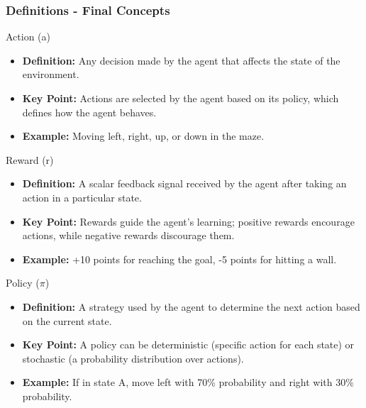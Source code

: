 \documentclass[aspectratio=169]{beamer}
\begin{document}
\begin{frame}[fragile]
    \frametitle{Definitions - Final Concepts}
    \begin{block}{Action (a)}
        \begin{itemize}
            \item \textbf{Definition:} Any decision made by the agent that affects the state of the environment.
            \item \textbf{Key Point:} Actions are selected by the agent based on its policy, which defines how the agent behaves.
            \item \textbf{Example:} Moving left, right, up, or down in the maze.
        \end{itemize}
    \end{block}

    \begin{block}{Reward (r)}
        \begin{itemize}
            \item \textbf{Definition:} A scalar feedback signal received by the agent after taking an action in a particular state.
            \item \textbf{Key Point:} Rewards guide the agent's learning; positive rewards encourage actions, while negative rewards discourage them.
            \item \textbf{Example:} +10 points for reaching the goal, -5 points for hitting a wall.
        \end{itemize}
    \end{block}

    \begin{block}{Policy (\(\pi\))}
        \begin{itemize}
            \item \textbf{Definition:} A strategy used by the agent to determine the next action based on the current state.
            \item \textbf{Key Point:} A policy can be deterministic (specific action for each state) or stochastic (a probability distribution over actions).
            \item \textbf{Example:} If in state A, move left with 70\% probability and right with 30\% probability.
        \end{itemize}
    \end{block}
\end{frame}
\end{document}
